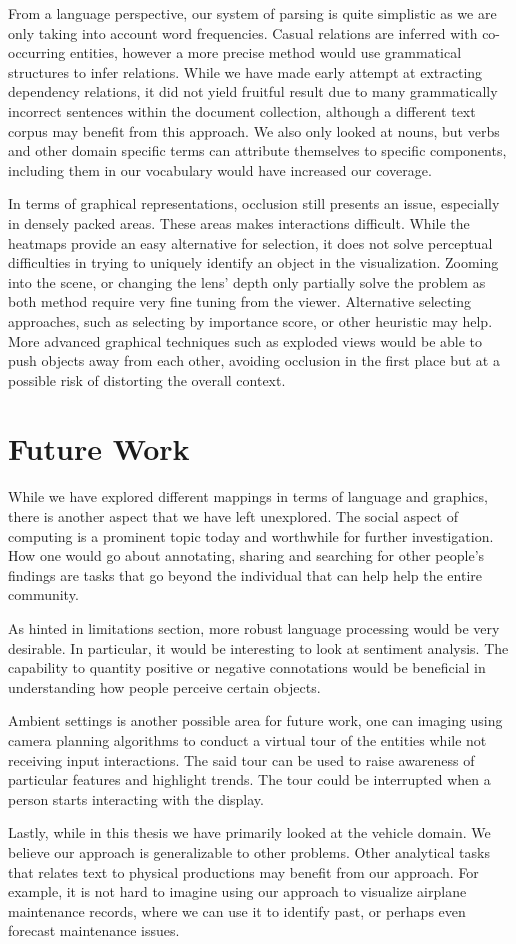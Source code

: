 From a language perspective, our system of parsing is quite simplistic as we are
only taking into account word frequencies. Casual relations are inferred with
co-occurring entities, however a more precise method would use grammatical
structures to infer relations. While we have made early attempt at extracting
dependency relations, it did not yield fruitful result due to many grammatically
incorrect sentences within the document collection, although a different text
corpus may benefit from this approach. We also only looked at nouns, but verbs
and other domain specific terms can attribute themselves to specific components,
including them in our vocabulary would have increased our coverage.

In terms of graphical representations, occlusion still presents an issue,
especially in densely packed areas. These areas makes interactions difficult.
While the heatmaps provide an easy alternative for selection, it does not solve
perceptual difficulties in trying to uniquely identify an object in the
visualization. Zooming into the scene, or changing the lens' depth only
partially solve the problem as both method require very fine tuning from the
viewer. Alternative selecting approaches, such as selecting by importance score,
or other heuristic may help. More advanced graphical techniques such as exploded
views would be able to push objects away from each other, avoiding occlusion in
the first place but at a possible risk of distorting the overall context.


\section{Future Work}
While we have explored different mappings in terms of language and graphics,
there is another aspect that we have left unexplored. The social aspect of
computing is a prominent topic today and worthwhile for further investigation.
How one would go about annotating, sharing and searching for other people's
findings are tasks that go beyond the individual that can help help the entire
community.

As hinted in limitations section, more robust language processing would be very
desirable. In particular, it would be interesting to look at sentiment analysis.
The capability to quantity positive or negative connotations would be beneficial
in understanding how people perceive certain objects.

Ambient settings is another possible area for future work, one can imaging using
camera planning algorithms to conduct a virtual tour of the entities while not
receiving input interactions. The said tour can be used to raise awareness of
particular features and highlight trends. The tour could be interrupted when a
person starts interacting with the display.

Lastly, while in this thesis we have primarily looked at the vehicle domain. We
believe our approach is generalizable to other problems. Other analytical tasks
that relates text to physical productions may benefit from our approach. For
example, it is not hard to imagine using our approach to visualize airplane
maintenance records, where we can use it to identify past, or perhaps even
forecast maintenance issues.
